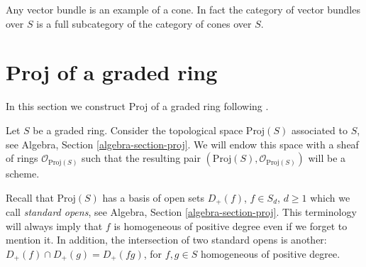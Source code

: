\noindent
Any vector bundle is an example of a cone. In fact the category of
vector bundles over $S$ is a full subcategory of the category of cones
over $S$.










\section{Proj of a graded ring}
\label{section-proj}

\noindent
In this section we construct Proj of a graded ring
following \cite[II, Section 2]{EGA}.

\medskip\noindent
Let $S$ be a graded ring. Consider the topological space $\text{Proj}(S)$
associated to $S$, see Algebra, Section \ref{algebra-section-proj}.
We will endow this space with a sheaf of rings $\mathcal{O}_{\text{Proj}(S)}$
such that the resulting pair $(\text{Proj}(S), \mathcal{O}_{\text{Proj}(S)})$
will be a scheme.

\medskip\noindent
Recall that $\text{Proj}(S)$ has a basis of open sets $D_{+}(f)$,
$f \in S_d$, $d \geq 1$ which we call {\it standard opens}, see Algebra,
Section \ref{algebra-section-proj}. This terminology will always
imply that $f$ is homogeneous of positive degree even if we forget to
mention it. In addition, the intersection of two standard opens is another:
$D_{+}(f) \cap D_{+}(g) = D_{+}(fg)$, for $f, g \in S$ homogeneous of positive
degree.


